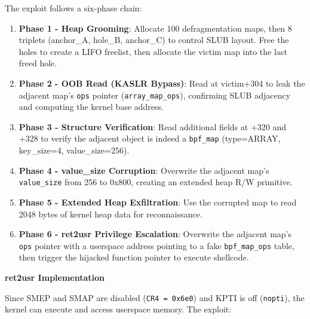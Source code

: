 The exploit follows a six-phase chain:

\begin{enumerate}
    \item \textbf{Phase 1 - Heap Grooming}: Allocate 100 defragmentation maps, then 8 triplets (anchor\_A, hole\_B, anchor\_C) to control SLUB layout. Free the holes to create a LIFO freelist, then allocate the victim map into the last freed hole.
    
    \item \textbf{Phase 2 - OOB Read (KASLR Bypass)}: Read at victim+304 to leak the adjacent map's \texttt{ops} pointer (\texttt{array\_map\_ops}), confirming SLUB adjacency and computing the kernel base address.
    
    \item \textbf{Phase 3 - Structure Verification}: Read additional fields at +320 and +328 to verify the adjacent object is indeed a \texttt{bpf\_map} (type=ARRAY, key\_size=4, value\_size=256).
    
    \item \textbf{Phase 4 - value\_size Corruption}: Overwrite the adjacent map's \texttt{value\_size} from 256 to 0x800, creating an extended heap R/W primitive.
    
    \item \textbf{Phase 5 - Extended Heap Exfiltration}: Use the corrupted map to read 2048 bytes of kernel heap data for reconnaissance.
    
    \item \textbf{Phase 6 - ret2usr Privilege Escalation}: Overwrite the adjacent map's \texttt{ops} pointer with a userspace address pointing to a fake \texttt{bpf\_map\_ops} table, then trigger the hijacked function pointer to execute shellcode.
\end{enumerate}

\textbf{ret2usr Implementation}

Since SMEP and SMAP are disabled (\texttt{CR4 = 0x6e0}) and KPTI is off (\texttt{nopti}), the kernel can execute and access userspace memory. The exploit:

